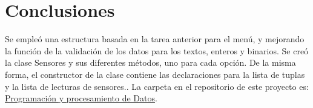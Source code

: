 \documentclass{assignment}
\begin{document}
	\section*{Conclusiones}
	Se empleó una estructura basada en la tarea anterior para el menú, y mejorando la función de la validación de los datos para los textos, enteros y binarios. Se creó la clase Sensores y sus diferentes métodos, uno para cada opción. De la misma forma, el constructor de la clase contiene las declaraciones para la lista de tuplas y la lista de lecturas de sensores..
	La carpeta en el repositorio de este proyecto es: \href{https://github.com/clivan/Programacion_y_Procesamiento_de_Datos_Infotec/2A}{Programación y procesamiento de Datos}.	
\end{document}
